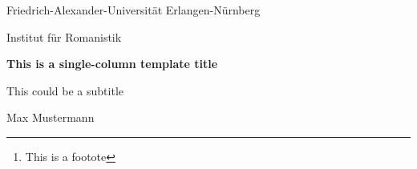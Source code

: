 \documentclass[11pt, a4paper]{article}
\begin{document}
\nocite{*} %

\begin{center}
  Friedrich-Alexander-Universität Erlangen-Nürnberg

  Institut für Romanistik

  \vspace{0.4cm}

  \Large \textbf{This is a single-column template title}

  \vspace{0.1cm} \small{This could be a subtitle}

  \vspace{0.4cm} \small{Max Mustermann}
  \vspace{1cm}
\end{center}

\tableofcontents
\thispagestyle{empty}
\pagestyle{empty}


\begin{abstract}

Lorem ipsum dolor sit amet, consectetur adipiscing elit. Aenean id blandit odio. Donec sit amet dui at dui interdum blandit. Mauris imperdiet augue non sollicitudin suscipit. Proin et mauris nec elit eleifend iaculis at ultrices sapien. Etiam venenatis mi ac nisi vestibulum vulputate. Morbi facilisis euismod dapibus. Integer consectetur nibh vel lectus pharetra finibus. Quisque interdum diam a purus condimentum, pulvinar egestas felis volutpat\footnote{This is a footote}.

Nulla facilisi. Nunc porttitor eros mi, ac feugiat felis placerat eget. Vestibulum mi lacus, eleifend in laoreet nec, gravida sed massa. Nunc gravida, sapien vitae gravida suscipit, purus quam tristique sapien, ac scelerisque velit ligula non neque. Curabitur pretium lectus in dapibus consequat. Maecenas semper non mi molestie hendrerit. Integer dictum neque nibh, sit amet bibendum risus mattis a.

Nunc at lobortis orci. Praesent varius enim vestibulum sapien efficitur egestas. Lorem ipsum dolor sit amet, consectetur adipiscing elit. Proin dictum elit a urna ultrices varius. Donec sed consectetur magna. Phasellus suscipit erat ante. Aenean metus orci, faucibus sit amet tortor a, porta dapibus neque. Curabitur pulvinar ultricies nisl, in finibus leo auctor in.

\end{abstract}
\end{document}
